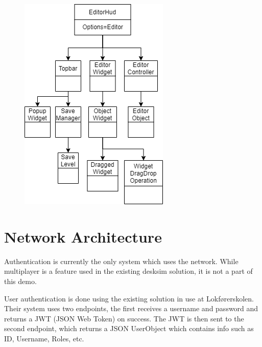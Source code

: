 \begin{figure}[H]
\begin{minipage}{.5\textwidth}
  \includegraphics[width=0.95\linewidth]{figures/Untitled Diagram-Editor.drawio.png}
  \label{fig:editor_mode}
\end{minipage}
\end{figure}





\section{Network Architecture}

Authentication is currently the only system which uses the network. While multiplayer is a feature used in the existing \gls{desksim} solution, it is not a part of this demo. 

User authentication is done using the existing solution in use at Lokførerskolen. Their system uses two endpoints, the first receives a username and password and returns a JWT (JSON Web Token) on success. The JWT is then sent to the second endpoint, which returns a JSON UserObject which contains info such as ID, Username, Roles, etc. 

